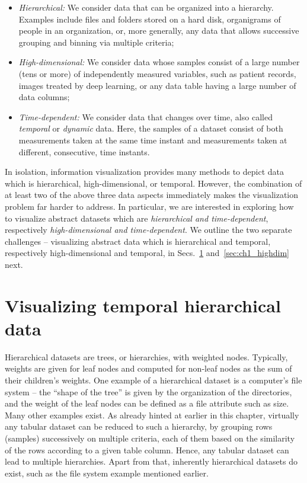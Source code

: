 \begin{itemize}
\item\emph{Hierarchical:} We consider data that can be organized into a hierarchy. Examples include files and folders stored on a hard disk, organigrams of people in an organization, or, more generally, any data that allows successive grouping and binning via multiple criteria;
\item\emph{High-dimensional:} We consider data whose samples consist of a large number (tens or more) of independently measured variables, such as patient records, images treated by deep learning, or any data table having a large number of data columns;
\item\emph{Time-dependent:} We consider data that changes over time, also called \emph{temporal} or \emph{dynamic} data. Here, the samples of a dataset consist of both measurements taken at the same time instant and measurements taken at different, consecutive, time instants. 
\end{itemize}

In isolation, information visualization provides many methods to depict data which is hierarchical, high-dimensional, or temporal. However, the combination of at least two of the above three data aspects immediately makes the visualization problem far harder to address. In particular, we are interested in exploring how to visualize abstract datasets which are \emph{hierarchical and time-dependent}, respectively \emph{high-dimensional and time-dependent}. We outline the two separate challenges -- visualizing abstract data which is hierarchical and temporal, respectively high-dimensional and temporal, in Secs.~\ref{sec:ch1_tempo} and~\ref{sec:ch1_highdim} next.


\section{Visualizing temporal hierarchical data}
\label{sec:ch1_tempo}
%
Hierarchical datasets are trees, or hierarchies, with weighted nodes. Typically, weights are given for leaf nodes and computed for non-leaf nodes as the sum of their children's weights. One example of a hierarchical dataset is a computer's file system -- the ``shape of the tree'' is given by the organization of the directories, and the weight of the leaf nodes can be defined as a file attribute such as size. Many other examples exist. As already hinted at earlier in this chapter, virtually any tabular dataset can be reduced to such a hierarchy, by grouping rows (samples) successively on multiple criteria, each of them based on the similarity of the rows according to a given table column. Hence, any tabular dataset can lead to multiple hierarchies. Apart from that, inherently hierarchical datasets do exist, such as the file system example mentioned earlier.

